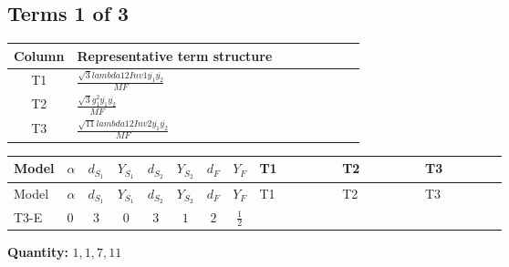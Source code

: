 \documentclass[8pt]{article}
\begin{document}
\begin{landscape}
\subsection*{Terms 1 of 3}
\begin{center}
\begin{tabular}{@{}c >{\raggedright\arraybackslash}p{0.82\linewidth}@{}}
\toprule
Column & Representative term structure \\
\midrule
T1 & \(\displaystyle \frac{\sqrt{3} lambda12Inv1 \overline{y_{1}} \overline{y_{2}}}{MF}\) \\
\midrule
T2 & \(\displaystyle \frac{\sqrt{3} g_{1}^{2} \overline{y_{1}} \overline{y_{2}}}{MF}\) \\
\midrule
T3 & \(\displaystyle \frac{\sqrt{11} lambda12Inv2 \overline{y_{1}} \overline{y_{2}}}{MF}\) \\
\midrule
\bottomrule
\end{tabular}
\end{center}
\smallskip
\tiny
\begin{longtable}{@{}llcccccc >{\raggedright\arraybackslash}p{0.21\linewidth} >{\raggedright\arraybackslash}p{0.21\linewidth} >{\raggedright\arraybackslash}p{0.21\linewidth}@{}}
\toprule
Model & $\alpha$ & $d_{S_1}$ & $Y_{S_1}$ & $d_{S_2}$ & $Y_{S_2}$ & $d_F$ & $Y_F$ & T1 & T2 & T3 \\
\midrule
\endfirsthead
\toprule
Model & $\alpha$ & $d_{S_1}$ & $Y_{S_1}$ & $d_{S_2}$ & $Y_{S_2}$ & $d_F$ & $Y_F$ & T1 & T2 & T3 \\
\midrule
\endhead
T3-E & $0$ & $3$ & $0$ & $3$ & $1$ & $2$ & $\frac{1}{2}$ & \scriptsize\adjustbox{max width=\linewidth}{$\begin{gathered} - \frac{\sqrt{3} lambda12Inv1 \overline{y_{1}} \overline{y_{2}}}{6 MF}\end{gathered}$} & \scriptsize\adjustbox{max width=\linewidth}{$\begin{gathered} \frac{\sqrt{3} g_{1}^{2} \overline{y_{1}} \overline{y_{2}}}{8 MF}\end{gathered}$} & \scriptsize\adjustbox{max width=\linewidth}{$\begin{gathered} \frac{3 \sqrt{11} lambda12Inv2 \overline{y_{1}} \overline{y_{2}}}{22 MF}\end{gathered}$} \\
\midrule
\bottomrule
\end{longtable}
\clearpage
\noindent\textbf{Quantity: }$\mathrm{1,1,7,11}$\par\smallskip

\end{landscape}
\end{document}
